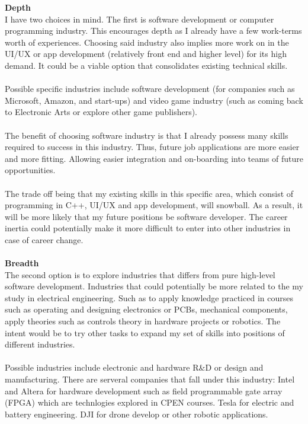 \documentclass[10pt,letterpaper]{article}
\begin{document}
\textbf{Depth}\\
I have two choices in mind. The first is software development or computer programming industry. This encourages depth as I already have a few work-terms worth of experiences. Choosing said industry also implies more work on in the UI/UX or app development (relatively front end and higher level) for its high demand. It could be a viable option that consolidates existing technical skills.\\
\\
Possible specific industries include software development (for companies such as Microsoft, Amazon, and start-ups) and video game industry (such as coming back to Electronic Arts or explore other game publishers).\\
\\
The benefit of choosing software industry is that I already possess many skills required to success in this industry. Thus, future job applications are more easier and more fitting. Allowing easier integration and on-boarding into teams of future opportunities.\\
\\
The trade off being that my existing skills in this specific area, which consist of programming in C++, UI/UX and app development, will snowball. As a result, it will be more likely that my future positions be software developer. The career inertia could potentially make it more difficult to enter into  other industries in case of career change.\\
\\
\textbf{Breadth}\\
The second option is to explore industries that differs from pure high-level software development. Industries that could potentially be more related to the my study in electrical engineering. Such as to apply knowledge practiced in courses such as operating and designing electronics or PCBs, mechanical components, apply theories such as controls theory in hardware projects or robotics. The intent would be to try other tasks to expand my set of skills into positions of different industries.\\
\\
Possible industries include electronic and hardware R\&D or design and manufacturing. There are serveral companies that fall under this industry: Intel and Altera for hardware development such as field programmable gate array (FPGA) which are technlogies explored in CPEN courses. Tesla for electric and battery engineering. DJI for drone develop or other robotic applications.\\
\end{document}
